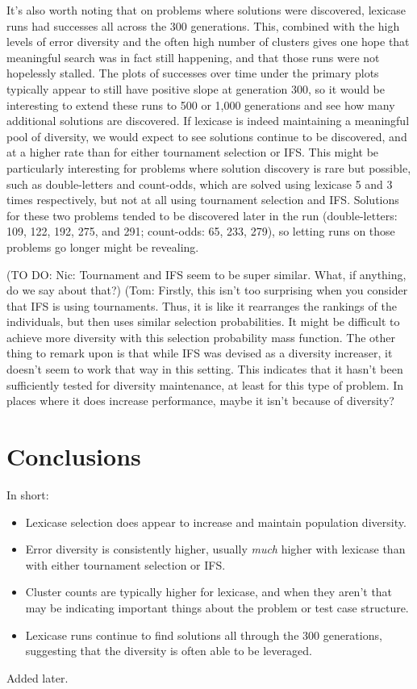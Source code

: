 It's also worth noting that on problems where solutions were discovered, lexicase runs had successes 
all across the 300 generations. This, combined with the high levels of error diversity and the often 
high number of clusters gives one hope that meaningful search was in fact still happening, and that 
those runs were not hopelessly stalled. The plots of successes over time under the primary plots
typically appear to still have positive slope at generation 300, so it would be interesting to
extend these runs to 500 or 1,000 generations and see how many additional solutions are discovered.
If lexicase is indeed maintaining a meaningful pool of diversity, we would expect to see solutions continue
to be discovered, and at a higher rate than for either tournament selection or IFS. This might be
particularly interesting for problems where solution discovery is rare but possible, such as
double-letters and count-odds, which are solved using lexicase 5 and 3 times respectively, but not
at all using tournament selection and IFS. Solutions for these two problems tended to be discovered
later in the run (double-letters: 109, 122, 192, 275, and 291; count-odds: 65, 233, 279), so letting
runs on those problems go longer might be revealing.

(TO DO: Nic: Tournament and IFS seem to be super similar. What, if anything, do we say about that?) (Tom: Firstly, this isn't too surprising when you consider that IFS is using tournaments. Thus, it is like it rearranges the rankings of the individuals, but then uses similar selection probabilities. It might be difficult to achieve more diversity with this selection probability mass function. The other thing to remark upon is that while IFS was devised as a diversity increaser, it doesn't seem to work that way in this setting. This indicates that it hasn't been sufficiently tested for diversity maintenance, at least for this type of problem. In places where it does increase performance, maybe it isn't because of diversity?

\section{Conclusions}

In short:
\begin{itemize}
	\item Lexicase selection does appear to increase and maintain population diversity.
	\item Error diversity is consistently higher, usually \emph{much} higher with lexicase than
	with either tournament selection or IFS.
	\item Cluster counts are typically higher for lexicase, and when they aren't that may be
	indicating important things about the problem or test case structure.
	\item Lexicase runs continue to find solutions all through the 300 generations, suggesting
	that the diversity is often able to be leveraged.
\end{itemize}

\begin{acknowledgement}
Added later.
\end{acknowledgement}



